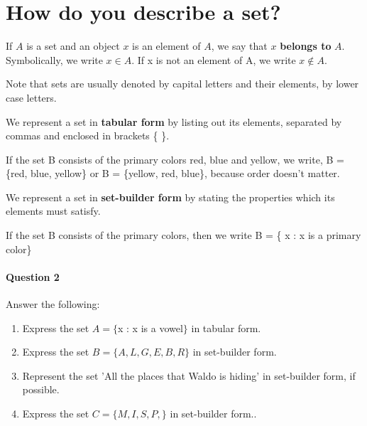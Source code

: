 \section{How do you describe a set?}
\begin{definition}

If $A$ is a set and an object $x$ is an element of $A$, we say that $x$ \textbf{belongs to} $A$. Symbolically, we write $x \in A$. If x is not an element of A, we write $x \notin A$. 
\end{definition}

\begin{remark}
Note that sets are usually denoted by capital letters and their elements, by lower case letters.
\end{remark}

\begin{definition}
We represent a set in \textbf{tabular form} by listing out its elements, separated by commas and enclosed in brackets \{ \}.
\end{definition}

\begin{example}
If the set B consists of the primary colors red, blue and yellow, we write, B = \{red, blue, yellow\} or B = \{yellow, red, blue\}, because order doesn't matter.
\end{example}

\begin{definition}
We represent a set in \textbf{set-builder form} by stating the properties which its elements must satisfy.
\end{definition}

\begin{example}
If the set B consists of the primary colors, then we write B = \{ x : x is a primary color\}
\end{example}

\paragraph{Question 2} Answer the following:
\begin{enumerate}
\item Express the set $A=\{$x : x is a vowel$\}$ in tabular form.
\vspace{3em}
\item Express the set $B =\{A, L, G, E, B, R\}$ in set-builder form.
\vspace{3em}
\item Represent the set 'All the places that Waldo is hiding' in set-builder form, if possible.
\vspace{3em}
\item Express the set $C =\{M, I, S, P, \}$ in set-builder form..
\vspace{3em}
\end{enumerate}



